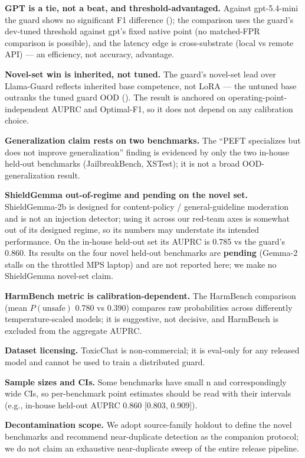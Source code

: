 \documentclass[sigconf,nonacm]{acmart}
\begin{document}
\textbf{GPT is a tie, not a beat, and threshold-advantaged.} Against gpt-5.4-mini the guard shows no significant F1 difference (); the comparison uses the guard's dev-tuned threshold against gpt's fixed native point (no matched-FPR comparison is possible), and the latency edge is cross-substrate (local vs remote API) --- an efficiency, not accuracy, advantage.

\textbf{Novel-set win is inherited, not tuned.} The guard's novel-set lead over Llama-Guard reflects inherited base competence, not LoRA --- the untuned base outranks the tuned guard OOD (). The result is anchored on operating-point-independent AUPRC and Optimal-F1, so it does not depend on any calibration choice.

\textbf{Generalization claim rests on two benchmarks.} The ``PEFT specializes but does not improve generalization'' finding is evidenced by only the two in-house held-out benchmarks (JailbreakBench, XSTest); it is not a broad OOD-generalization result.

\textbf{ShieldGemma out-of-regime and pending on the novel set.} ShieldGemma-2b is designed for content-policy / general-guideline moderation and is not an injection detector; using it across our red-team axes is somewhat out of its designed regime, so its numbers may understate its intended performance. On the in-house held-out set its AUPRC is 0.785 vs the guard's 0.860. Its results on the four novel held-out benchmarks are \textbf{pending} (Gemma-2 stalls on the throttled MPS laptop) and are not reported here; we make no ShieldGemma novel-set claim.

\textbf{HarmBench metric is calibration-dependent.} The HarmBench comparison (mean $P(\text{unsafe})$ 0.780 vs 0.390) compares raw probabilities across differently temperature-scaled models; it is suggestive, not decisive, and HarmBench is excluded from the aggregate AUPRC.

\textbf{Dataset licensing.} ToxicChat is non-commercial; it is eval-only for any released model and cannot be used to train a distributed guard.

\textbf{Sample sizes and CIs.} Some benchmarks have small n and correspondingly wide CIs, so per-benchmark point estimates should be read with their intervals (e.g., in-house held-out AUPRC 0.860 [0.803, 0.909]).

\textbf{Decontamination scope.} We adopt source-family holdout to define the novel benchmarks and recommend near-duplicate detection as the companion protocol; we do not claim an exhaustive near-duplicate sweep of the entire release pipeline.
\end{document}
